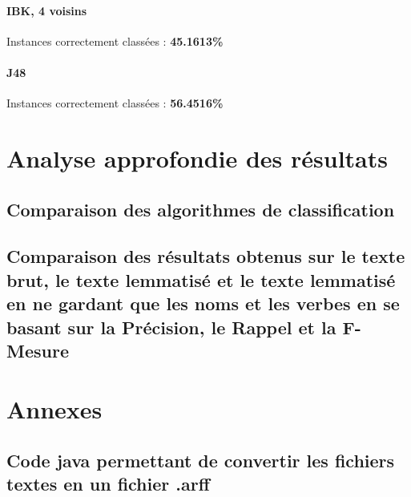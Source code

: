 \documentclass[a4paper,11pt]{article}
\begin{document}
\paragraph{IBK, 4 voisins} Instances correctement classées : \textbf{45.1613\%}
\paragraph{J48} Instances correctement classées : \textbf{56.4516\%}

\newpage
\section{Analyse approfondie des résultats}
\subsection{Comparaison des algorithmes de classification}

\subsection{Comparaison des résultats obtenus sur le texte brut, le texte lemmatisé et le texte lemmatisé en ne gardant que les noms et les verbes en se basant sur la Précision, le Rappel et la F-Mesure}



\newpage
\section*{Annexes}
\subsection*{Code java permettant de convertir les fichiers textes en un fichier .arff}
\end{document}
